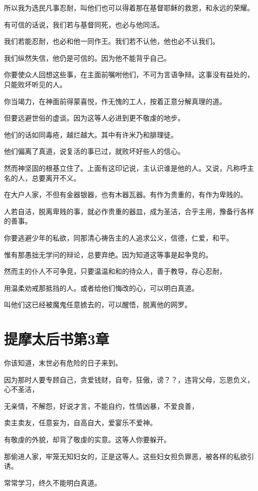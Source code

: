 \documentclass[12pt,oneside]{book}
\begin{document}
所以我为选民凡事忍耐，叫他们也可以得着那在基督耶稣的救恩，和永远的荣耀。

有可信的话说，我们若与基督同死，也必与他同活。

我们若能忍耐，也必和他一同作王。我们若不认他，他也必不认我们。

我们纵然失信，他仍是可信的。因为他不能背乎自己。

你要使众人回想这些事，在主面前嘱咐他们，不可为言语争辩。这事没有益处的，只能败坏听见的人。

你当竭力，在神面前得蒙喜悦，作无愧的工人，按着正意分解真理的道。

但要远避世俗的虚谈。因为这等人必进到更不敬虔的地步。

他们的话如同毒疮，越烂越大。其中有许米乃和腓理徒。

他们偏离了真道，说复活的事已过，就败坏好些人的信心。

然而神坚固的根基立住了。上面有这印记说，主认识谁是他的人。又说，凡称呼主名的人，总要离开不义。

在大户人家，不但有金器银器，也有木器瓦器。有作为贵重的，有作为卑贱的。

人若自洁，脱离卑贱的事，就必作贵重的器皿，成为圣洁，合乎主用，豫备行各样的善事。

你要逃避少年的私欲，同那清心祷告主的人追求公义，信德，仁爱，和平。

惟有那愚拙无学问的辩论，总要弃绝。因为知道这等事是起争竞的。

然而主的仆人不可争竞，只要温温和和的待众人，善于教导，存心忍耐，

用温柔劝戒那抵挡的人。或者给他们悔改的心，可以明白真道。

叫他们这已经被魔鬼任意掳去的，可以醒悟，脱离他的网罗。

\chapter{提摩太后书第3章}
你该知道，末世必有危险的日子来到。

因为那时人要专顾自己，贪爱钱财，自夸，狂傲，谤？？，违背父母，忘恩负义，心不圣洁，

无亲情，不解怨，好说才言，不能自约，性情凶暴，不爱良善，

卖主卖友，任意妄为，自高自大，爱宴乐不爱神。

有敬虔的外貌，却背了敬虔的实意。这等人你要躲开。

那偷进人家，牢笼无知妇女的，正是这等人。这些妇女担负罪恶，被各样的私欲引诱。

常常学习，终久不能明白真道。
\end{document}
